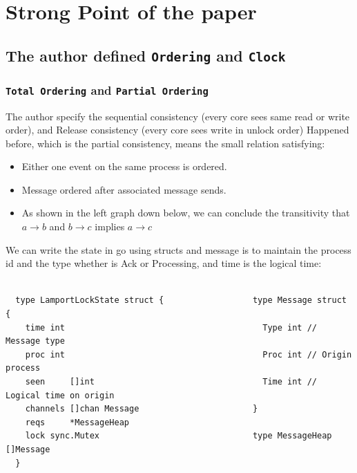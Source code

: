\documentclass[acmlarge]{acmart}
\begin{document}


\maketitle

\section{Strong Point of the paper}


\subsection {The author defined \texttt{Ordering} and \texttt{Clock}}
\subsubsection{\texttt{Total Ordering} and \texttt{Partial Ordering}}
The author specify the sequential consistency (every core sees same read or write order),
and Release consistency (every core sees write in unlock order)
Happened before, which is the partial consistency, means the small relation satisfying:
\begin{itemize}
  \item Either one event on the same process is ordered.
  \item Message ordered after associated message sends.
  \item As shown in the left graph down below, we can conclude the
        transitivity that $a \rightarrow b$ and $b \rightarrow c$ implies $a \rightarrow c$
\end{itemize}

We can write the state in go using structs and message is to maintain the process id and the type whether is Ack or Processing,
and time is the logical time:

\begin{lstlisting}

  type LamportLockState struct {                  type Message struct {
    time int                                      	Type int // Message type
    proc int                                      	Proc int // Origin process
    seen     []int                                	Time int // Logical time on origin
    channels []chan Message                       }
    reqs     *MessageHeap                         
    lock sync.Mutex                               type MessageHeap []Message
  }                 
  \end{lstlisting}
\end{document}
